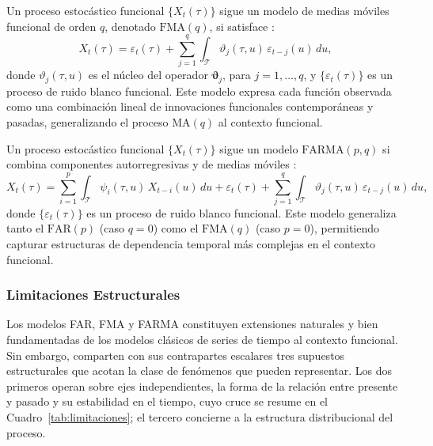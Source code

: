 \begin{definition} Un proceso estocástico funcional $\{X_t(\tau)\}$ sigue un modelo de medias móviles funcional de orden $q$, denotado $\mathrm{FMA}(q)$, si satisface \cite{02_02_klepsch2017innovations}:
\begin{equation}
    X_t(\tau) = \varepsilon_t(\tau) + \sum_{j=1}^{q} \int_{\mathcal{T}}
    \vartheta_j(\tau, u)\, \varepsilon_{t-j}(u)\, du,
\end{equation}
donde $\vartheta_j(\tau, u)$ es el núcleo del operador $\boldsymbol{\vartheta}_j$, para $j = 1, \dots, q$, y $\{\varepsilon_t(\tau)\}$ es un proceso de ruido blanco funcional. Este modelo expresa cada función observada como una combinación lineal de innovaciones funcionales contemporáneas y pasadas, generalizando el proceso $\mathrm{MA}(q)$ al contexto funcional.
\end{definition}

\begin{definition}
Un proceso estocástico funcional $\{X_t(\tau)\}$ sigue un modelo $\mathrm{FARMA}(p,q)$ si combina componentes autorregresivas y de medias móviles \cite{02_02_klepsch2017prediction}:
\begin{equation}
    X_t(\tau) = \sum_{i=1}^{p} \int_{\mathcal{T}} \psi_i(\tau, u)\,
    X_{t-i}(u)\, du
    + \varepsilon_t(\tau)
    + \sum_{j=1}^{q} \int_{\mathcal{T}} \vartheta_j(\tau, u)\,
    \varepsilon_{t-j}(u)\, du,
\end{equation}
donde $\{\varepsilon_t(\tau)\}$ es un proceso de ruido blanco funcional. Este modelo generaliza tanto el $\mathrm{FAR}(p)$ (caso $q = 0$) como el $\mathrm{FMA}(q)$ (caso $p = 0$), permitiendo capturar estructuras de dependencia temporal más complejas en el contexto funcional.
\end{definition}

\subsubsection{Limitaciones Estructurales}
\label{02_02_02_01_limitaciones_estructurales}
Los modelos FAR, FMA y FARMA constituyen extensiones naturales y bien fundamentadas de los modelos clásicos de series de tiempo al contexto funcional. Sin embargo, comparten con sus contrapartes escalares tres supuestos estructurales que acotan la clase de fenómenos que pueden representar. Los dos primeros operan sobre ejes independientes, la forma de la relación entre presente y pasado y su estabilidad en el tiempo, cuyo cruce se resume en el Cuadro~\ref{tab:limitaciones}; el tercero concierne a la estructura distribucional del proceso.

